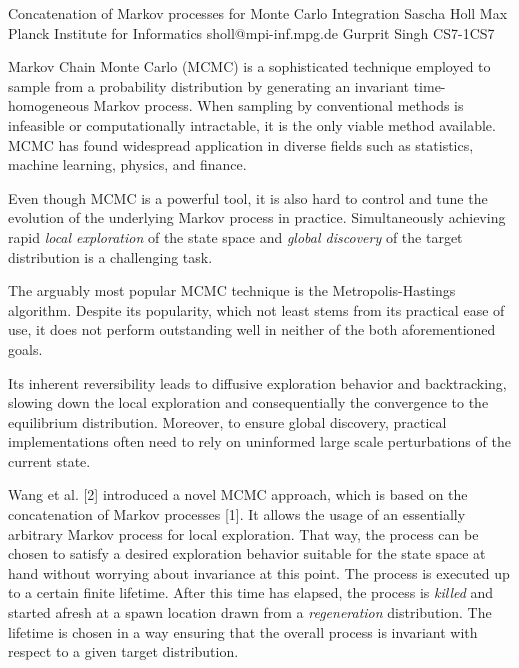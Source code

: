 \begin{talk}
  {Concatenation of Markov processes for Monte Carlo Integration}%
  {Sascha Holl}%
  {Max Planck Institute for Informatics}%
  {sholl@mpi-inf.mpg.de}%
  {Gurprit Singh}%
{}{}{CS7-1}{CS7}


Markov Chain Monte Carlo (MCMC) is a sophisticated technique employed to sample from a probability distribution by generating an invariant time-homogeneous Markov process. When sampling by conventional methods is infeasible or computationally intractable, it is the only viable method available. MCMC has found widespread application in diverse fields such as statistics, machine learning, physics, and finance.

Even though MCMC is a powerful tool, it is also hard to control and tune the evolution of the underlying Markov process in practice. Simultaneously achieving rapid \emph{local exploration} of the state space and \emph{global discovery} of the target distribution is a challenging task.

The  arguably most popular MCMC technique is the Metropolis-Hastings algorithm. Despite its popularity, which not least stems from its practical ease of use, it does not perform outstanding well in neither of the both aforementioned goals.

Its inherent reversibility leads to diffusive exploration behavior and backtracking, slowing down the local exploration and consequentially the convergence to the equilibrium distribution. Moreover, to ensure global discovery, practical implementations often need to rely on uninformed large scale perturbations of the current state.

Wang et al. [2] introduced a novel MCMC approach, which is based on the concatenation of Markov processes [1]. It allows the usage of an essentially arbitrary Markov process for local exploration. That way, the process can be chosen to satisfy a desired exploration behavior suitable for the state space at hand without worrying about invariance at this point. The process is executed up to a certain finite lifetime. After this time has elapsed, the process is \textit{killed} and started afresh at a spawn location drawn from a \textit{regeneration} distribution. The lifetime is chosen in a way ensuring that the overall process is invariant with respect to a given target distribution.


\end{talk}
